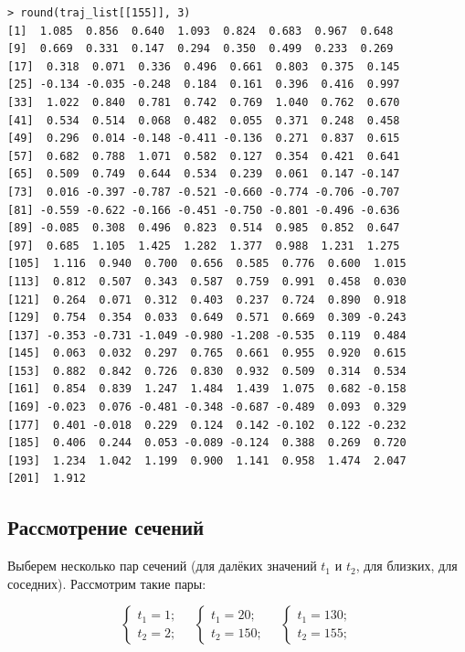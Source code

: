 \documentclass[14pt,a4paper]{scrartcl}
\begin{document}
	
\begin{verbatim}
> round(traj_list[[155]], 3)
[1]  1.085  0.856  0.640  1.093  0.824  0.683  0.967  0.648
[9]  0.669  0.331  0.147  0.294  0.350  0.499  0.233  0.269
[17]  0.318  0.071  0.336  0.496  0.661  0.803  0.375  0.145
[25] -0.134 -0.035 -0.248  0.184  0.161  0.396  0.416  0.997
[33]  1.022  0.840  0.781  0.742  0.769  1.040  0.762  0.670
[41]  0.534  0.514  0.068  0.482  0.055  0.371  0.248  0.458
[49]  0.296  0.014 -0.148 -0.411 -0.136  0.271  0.837  0.615
[57]  0.682  0.788  1.071  0.582  0.127  0.354  0.421  0.641
[65]  0.509  0.749  0.644  0.534  0.239  0.061  0.147 -0.147
[73]  0.016 -0.397 -0.787 -0.521 -0.660 -0.774 -0.706 -0.707
[81] -0.559 -0.622 -0.166 -0.451 -0.750 -0.801 -0.496 -0.636
[89] -0.085  0.308  0.496  0.823  0.514  0.985  0.852  0.647
[97]  0.685  1.105  1.425  1.282  1.377  0.988  1.231  1.275
[105]  1.116  0.940  0.700  0.656  0.585  0.776  0.600  1.015
[113]  0.812  0.507  0.343  0.587  0.759  0.991  0.458  0.030
[121]  0.264  0.071  0.312  0.403  0.237  0.724  0.890  0.918
[129]  0.754  0.354  0.033  0.649  0.571  0.669  0.309 -0.243
[137] -0.353 -0.731 -1.049 -0.980 -1.208 -0.535  0.119  0.484
[145]  0.063  0.032  0.297  0.765  0.661  0.955  0.920  0.615
[153]  0.882  0.842  0.726  0.830  0.932  0.509  0.314  0.534
[161]  0.854  0.839  1.247  1.484  1.439  1.075  0.682 -0.158
[169] -0.023  0.076 -0.481 -0.348 -0.687 -0.489  0.093  0.329
[177]  0.401 -0.018  0.229  0.124  0.142 -0.102  0.122 -0.232
[185]  0.406  0.244  0.053 -0.089 -0.124  0.388  0.269  0.720
[193]  1.234  1.042  1.199  0.900  1.141  0.958  1.474  2.047
[201]  1.912
\end{verbatim}



\pagebreak

\subsection*{Рассмотрение сечений}
Выберем несколько пар сечений (для далёких значений $t_1$ и $t_2$, для близких, для соседних). Рассмотрим такие пары:

\begin{equation*}
		\begin{cases}
			t_1 = 1;\\
			t_2 = 2;
		\end{cases}
		\quad
		\begin{cases}
			t_1 = 20;\\
			t_2 = 150;
		\end{cases}
		\quad
		\begin{cases}
			t_1 = 130;\\
			t_2 = 155;
		\end{cases}
\end{equation*}
\end{document}

